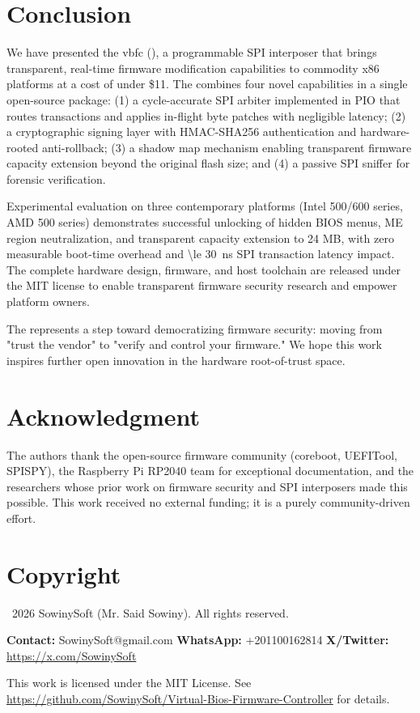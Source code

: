 \section{Conclusion}
\label{sec:conclusion}

We have presented the \acf{vbfc} (\vbfc), a programmable \ac{SPI} interposer that brings transparent, real-time firmware modification capabilities to commodity x86 platforms at a cost of under \$11. The \vbfc combines four novel capabilities in a single open-source package: (1) a cycle-accurate \ac{SPI} arbiter implemented in \ac{PIO} that routes transactions and applies in-flight byte patches with negligible latency; (2) a cryptographic signing layer with \ac{HMAC}-\ac{SHA}256 authentication and hardware-rooted anti-rollback; (3) a shadow map mechanism enabling transparent firmware capacity extension beyond the original flash size; and (4) a passive \ac{SPI} sniffer for forensic verification.

Experimental evaluation on three contemporary platforms (Intel 500/600 series, AMD 500 series) demonstrates successful unlocking of hidden \ac{BIOS} menus, \ac{ME} region neutralization, and transparent capacity extension to 24 MB, with zero measurable boot-time overhead and \SI{\le 30}{ns} \ac{SPI} transaction latency impact. The complete hardware design, firmware, and host toolchain are released under the MIT license to enable transparent firmware security research and empower platform owners.

The \vbfc represents a step toward democratizing firmware security: moving from "trust the vendor" to "verify and control your firmware." We hope this work inspires further open innovation in the hardware root-of-trust space.

\section*{Acknowledgment}
The authors thank the open-source firmware community (coreboot, UEFITool, SPISPY), the Raspberry Pi RP2040 team for exceptional documentation, and the researchers whose prior work on firmware security and SPI interposers made this possible. This work received no external funding; it is a purely community-driven effort.

\section*{Copyright}
\textcopyright\ 2026 SowinySoft (Mr. Said Sowiny). All rights reserved.

\textbf{Contact:} SowinySoft@gmail.com \quad \textbf{WhatsApp:} +201100162814 \quad \textbf{X/Twitter:} \url{https://x.com/SowinySoft}

This work is licensed under the MIT License. See \url{https://github.com/SowinySoft/Virtual-Bios-Firmware-Controller} for details.